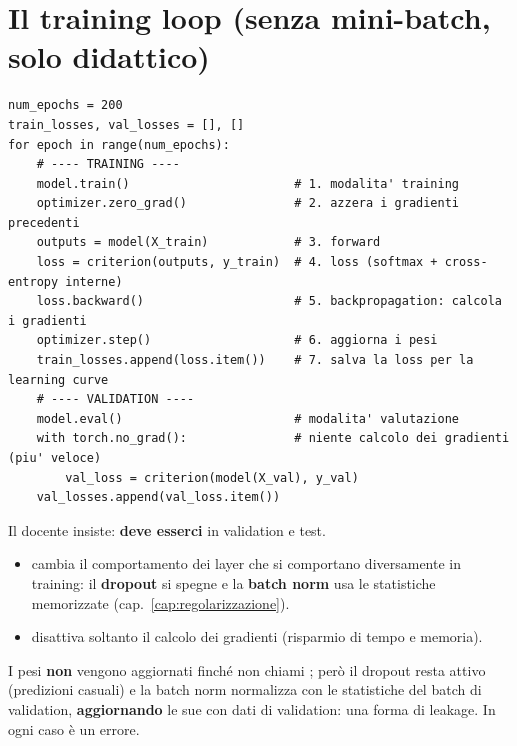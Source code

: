 \section{Il training loop (senza mini-batch, solo didattico)}
\begin{lstlisting}
num_epochs = 200
train_losses, val_losses = [], []
for epoch in range(num_epochs):
    # ---- TRAINING ----
    model.train()                       # 1. modalita' training
    optimizer.zero_grad()               # 2. azzera i gradienti precedenti
    outputs = model(X_train)            # 3. forward
    loss = criterion(outputs, y_train)  # 4. loss (softmax + cross-entropy interne)
    loss.backward()                     # 5. backpropagation: calcola i gradienti
    optimizer.step()                    # 6. aggiorna i pesi
    train_losses.append(loss.item())    # 7. salva la loss per la learning curve
    # ---- VALIDATION ----
    model.eval()                        # modalita' valutazione
    with torch.no_grad():               # niente calcolo dei gradienti (piu' veloce)
        val_loss = criterion(model(X_val), y_val)
    val_losses.append(val_loss.item())
\end{lstlisting}

\begin{attenzione}
Il docente insiste: \textbf{ deve esserci} in validation e test.
\begin{itemize}
  \item {} cambia il comportamento dei layer che si comportano diversamente in training: il
        \textbf{dropout} si spegne e la \textbf{batch norm} usa le statistiche memorizzate (cap.~\ref{cap:regolarizzazione}).
  \item {} disattiva soltanto il calcolo dei gradienti (risparmio di tempo e memoria).
\end{itemize}
\end{attenzione}
\begin{integrazione}
I pesi \textbf{non} vengono aggiornati finché non chiami ; però il dropout resta attivo (predizioni
casuali) e la batch norm normalizza con le statistiche del batch di validation, \textbf{aggiornando} le sue
 con dati di validation: una forma di leakage. In ogni caso è un errore.
\end{integrazione}

